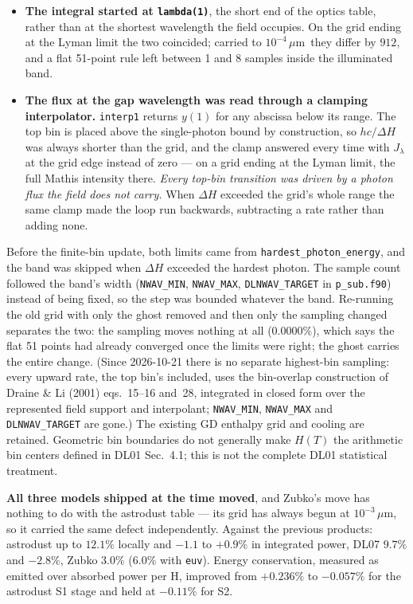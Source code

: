 \documentclass{my_memo}
\newcommand{\code}[1]{\texttt{#1}}
\newcommand{\um}{\ensuremath{\,\mu\mathrm{m}}}
\begin{document}
\begin{itemize}
\item \textbf{The integral started at \code{lambda(1)}}, the short end of the
      optics table, rather than at the shortest wavelength the field occupies.
      On the grid ending at the Lyman limit the two coincided; carried to
      $10^{-4}$\um\ they differ by $912$, and a flat 51-point rule left between
      1 and 8 samples inside the illuminated band.
\item \textbf{The flux at the gap wavelength was read through a clamping
      interpolator.} \code{interp1} returns $y(1)$ for any abscissa below its
      range. The top bin is placed above the single-photon bound by
      construction, so $hc/\Delta H$ was always shorter than the grid, and the
      clamp answered every time with $J_\lambda$ at the grid edge instead of
      zero --- on a grid ending at the Lyman limit, the full Mathis intensity
      there. \emph{Every top-bin transition was driven by a photon flux the
      field does not carry.} When $\Delta H$ exceeded the grid's whole range the
      same clamp made the loop run backwards, subtracting a rate rather than
      adding none.
\end{itemize}

Before the finite-bin update, both limits came from
\code{hardest\_photon\_energy}, and the band was skipped when $\Delta H$
exceeded the hardest photon. The sample count followed the band's width (\code{NWAV\_MIN}, \code{NWAV\_MAX}, \code{DLNWAV\_TARGET} in
\code{p\_sub.f90}) instead of being fixed, so the step was bounded whatever the
band. Re-running the old grid with only the ghost removed and then only the
sampling changed separates the two: the sampling moves nothing at all
($0.0000\%$), which says the flat 51 points had already converged once the
limits were right; the ghost carries the entire change. (Since 2026-10-21
there is no separate highest-bin sampling: every upward rate, the top bin's
included, uses the bin-overlap construction of Draine \& Li (2001)
eqs.~15--16 and~28, integrated in closed form over the represented field
support and interpolant;
\code{NWAV\_MIN}, \code{NWAV\_MAX} and \code{DLNWAV\_TARGET} are gone.) The
existing GD enthalpy grid and cooling are retained. Geometric bin boundaries
do not generally make $H(T)$ the arithmetic bin centers defined in DL01
Sec.~4.1; this is not the complete DL01 statistical treatment.

\textbf{All three models shipped at the time moved}, and Zubko's move has nothing to do with
the astrodust table --- its grid has always begun at $10^{-3}$\um, so it carried
the same defect independently. Against the previous products: astrodust up to
$12.1\%$ locally and $-1.1$ to $+0.9\%$ in integrated power, DL07 $9.7\%$ and
$-2.8\%$, Zubko $3.0\%$ ($6.0\%$ with \code{euv}). Energy conservation, measured
as emitted over absorbed power per H, improved from $+0.236\%$ to $-0.057\%$ for
the astrodust S1 stage and held at $-0.11\%$ for S2.
\end{document}
